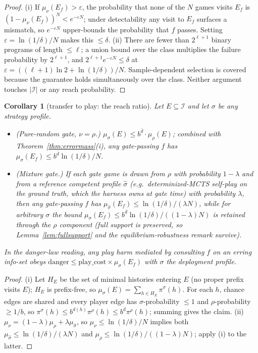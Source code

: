 \documentclass[11pt]{article}
\newtheorem{corollary}{Corollary}
\theoremstyle{remark}
\newcommand{\Ireach}{\mathcal{I}}
\begin{document}
\begin{proof}
(i) If $\mu_\nu(E_f) > \varepsilon$, the probability that none of the $N$ games visits $E_f$ is $(1 - \mu_\nu(E_f))^N < e^{-\varepsilon N}$; under detectability any visit to $E_f$ surfaces a mismatch, so $e^{-\varepsilon N}$ upper-bounds the probability that $f$ passes. Setting $\varepsilon = \ln(1/\delta)/N$ makes this $\leq \delta$. (ii) There are fewer than $2^{\ell+1}$ binary programs of length $\leq \ell$; a union bound over the class multiplies the failure probability by $2^{\ell+1}$, and $2^{\ell+1} e^{-\varepsilon N} \leq \delta$ at $\varepsilon = ((\ell+1)\ln 2 + \ln(1/\delta))/N$. Sample-dependent selection is covered because the guarantee holds simultaneously over the class. Neither argument touches $|\Ireach|$ or any reach probability.
\end{proof}

\begin{corollary}[transfer to play: the reach ratio]
\label{cor:reachratio}
Let $E \subseteq \Ireach$ and let $\sigma$ be \emph{any} strategy profile.
\begin{itemize}
\item[(i)] (\emph{Pure-random gate}, $\nu = \rho$.) $\mu_\sigma(E) \leq b^{\bar d} \cdot \mu_\rho(E)$; combined with Theorem~\ref{thm:errormass}(i), any gate-passing $f$ has $\mu_\sigma(E_f) \leq b^{\bar d} \ln(1/\delta) / N$.
\item[(ii)] (\emph{Mixture gate.}) If each gate game is drawn from $\rho$ with probability $1-\lambda$ and from a reference competent profile $\hat\sigma$ (e.g.\ determinized-MCTS self-play on the ground truth, which the harness owns at gate time) with probability $\lambda$, then any gate-passing $f$ has $\mu_{\hat\sigma}(E_f) \leq \ln(1/\delta)/(\lambda N)$, while for arbitrary $\sigma$ the bound $\mu_\sigma(E_f) \leq b^{\bar d} \ln(1/\delta) / ((1-\lambda) N)$ is retained through the $\rho$ component (full support is preserved, so Lemma~\ref{lem:fullsupport} and the equilibrium-robustness remark survive).
\end{itemize}
In the danger-law reading, any play harm mediated by consulting $f$ on an erring info-set obeys $\mathrm{danger} \leq \mathrm{play\_cost} \times \mu_\sigma(E_f)$ with $\sigma$ the deployment profile.
\end{corollary}

\begin{proof}
(i) Let $H_E$ be the set of minimal histories entering $E$ (no proper prefix visits $E$); $H_E$ is prefix-free, so $\mu_\sigma(E) = \sum_{h \in H_E} \pi^\sigma(h)$. For each $h$, chance edges are shared and every player edge has $\sigma$-probability $\leq 1$ and $\rho$-probability $\geq 1/b$, so $\pi^\sigma(h) \leq b^{d(h)} \pi^\rho(h) \leq b^{\bar d} \pi^\rho(h)$; summing gives the claim. (ii) $\mu_\nu = (1-\lambda)\mu_\rho + \lambda \mu_{\hat\sigma}$, so $\mu_\nu \leq \ln(1/\delta)/N$ implies both $\mu_{\hat\sigma} \leq \ln(1/\delta)/(\lambda N)$ and $\mu_\rho \leq \ln(1/\delta)/((1-\lambda)N)$; apply (i) to the latter.
\end{proof}
\end{document}
